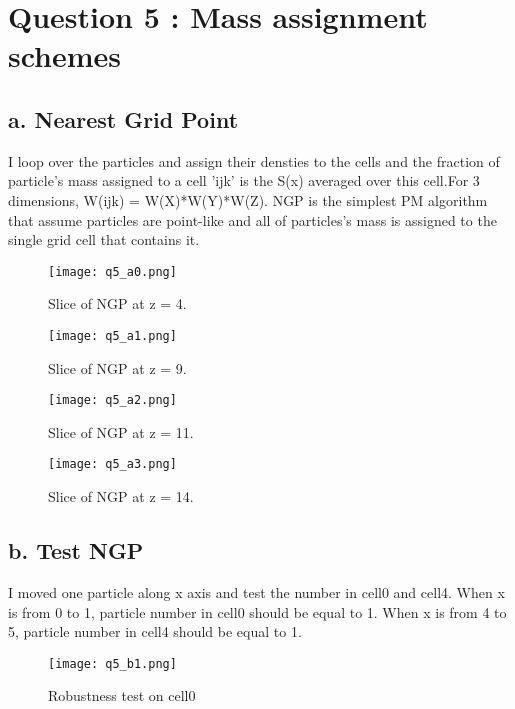 \section{Question 5 : Mass assignment schemes}
\subsection{a. Nearest Grid Point}
I loop over the particles and assign their densties to the cells and the fraction of particle's mass assigned to 
a cell 'ijk' is the S(x) averaged over this cell.For 3 dimensions, W(ijk) = W(X)*W(Y)*W(Z). 
NGP is the simplest PM algorithm that assume particles are point-like and all of particles's mass is assigned to 
the single grid cell that contains it.




\begin{figure}[h!]
  \centering
  \texttt{[image: q5\_a0.png]}
  \caption{Slice of NGP at z = 4.}
  \label{fig:NGP4}
\end{figure}

\begin{figure}[h!]
  \centering
  \texttt{[image: q5\_a1.png]}
  \caption{Slice of NGP at z = 9.}
  \label{fig:NGP9}
\end{figure}

\begin{figure}[h!]
  \centering
  \texttt{[image: q5\_a2.png]}
  \caption{Slice of NGP at z = 11.}
  \label{fig:NGP11}
\end{figure}

\begin{figure}[h!]
  \centering
  \texttt{[image: q5\_a3.png]}
  \caption{Slice of NGP at z = 14.}
  \label{fig:NGP14}
\end{figure}


\subsection{b. Test NGP}
I moved one particle along x axis and test the number in cell0 and cell4.
When x is from 0 to 1, particle number in cell0 should be equal to 1.
When x is from 4 to 5, particle number in cell4 should be equal to 1.


\begin{figure}[h!]
  \centering
  \texttt{[image: q5\_b1.png]}
  \caption{Robustness test on cell0}
  \label{fig:cell0}
\end{figure}

